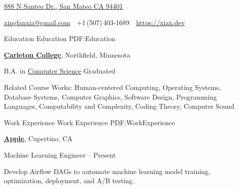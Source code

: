 \documentclass[letterpaper,MMMyyyy,nonstopmode]{simpleresumecv}
\newcommand{\CVAuthor}{Xingfan Xia}
\newcommand{\CVWebpage}{https://xiax.dev}
\begin{document}

\Title{\CVAuthor}

\begin{SubTitle}
\href{https://www.google.com/maps/place/888+N+San+Mateo+Dr,+San+Mateo,+CA+94401}
{888 N Santeo Dr., San Mateo CA 94401}
\par
\href{mailto:xingfanxia@gmail.com}
{xingfanxia@gmail.com}
\,\SubBulletSymbol\,
+1\,(507)\,403-1689
\,\SubBulletSymbol\,
\href{\CVWebpage}
{\url{\CVWebpage}}
\end{SubTitle}

\begin{Body}


\Section
{Education}
{Education}
{PDF:Education}

\Entry
\href{https://www.carleton.edu/}
{\textbf{Carleton College}},
Northfield, Minnesota

\Gap
\BulletItem
B.A. in
\href{https://apps.carleton.edu/curricular/cs/}
{Computer Science}
\hfill
Graduated 
\begin{Detail}
\SubBulletItem
Related Course Works: Human-centered Computing, Operating Systems, Database Systems, Computer Graphics, Software Design, Programming Languages, Computability and Complexity, Coding Theory, Computer Sound

\end{Detail}


\Section
{Work\newline
Experience}
{Work Experience}
{PDF:WorkExperience}

\Entry
\href{https://press.airbnb.com/about-us/}
{\textbf{Apple}},
Cupertino, CA

\Gap
\BulletItem
Machine Learning Engineer
\hfill
{} --
Present
\begin{Detail}
\SubBulletItem
Develop Airflow DAGs to automate machine learning model training, optimization, deployment, and A/B testing.
\end{Detail}


\end{Body}
\end{document}
